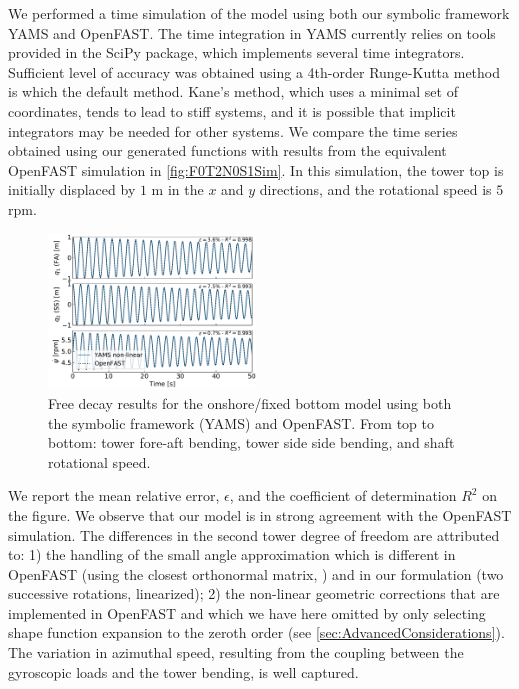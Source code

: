 \documentclass[wes, manuscript]{copernicus}
\begin{document}
We performed a time simulation of the model using both our symbolic framework YAMS and OpenFAST.
The time integration in YAMS currently relies on tools provided in the SciPy package, which implements several time integrators.
Sufficient level of accuracy was obtained using a 4th-order Runge-Kutta method is which the default method.
Kane's method, which uses a minimal set of coordinates, tends to lead to stiff systems, and it is possible that implicit integrators may be needed for other systems.
We compare the time series obtained using our generated functions with results from the equivalent OpenFAST simulation in \autoref{fig:F0T2N0S1Sim}.
In this simulation, the tower top is initially displaced by $1$ \unit{m} in the $x$ and $y$ directions, and the rotational speed is $5$ \unit{rpm}.
\noindent\begin{figure}[!htb]\centering%
  \includegraphics[width=0.49\textwidth]{figs/F0T2N0S1Sim}
  \caption{Free decay results for the onshore/fixed bottom model using both the symbolic framework (YAMS) and OpenFAST. From top to bottom: tower fore-aft bending, tower side side bending, and shaft rotational speed.}\label{fig:F0T2N0S1Sim}%
\end{figure}
We report the mean relative error, $\epsilon$, and the coefficient of determination $R^2$ on the figure.
We observe that our model is in strong agreement with the OpenFAST simulation.
The differences in the second tower degree of freedom are attributed to: 1) the handling of the small angle approximation which is different in OpenFAST (using the closest orthonormal matrix, \cite{Jonkman:2009}) and in our formulation (two successive rotations, linearized); 2) the non-linear geometric corrections that are implemented in OpenFAST and which we have here omitted by only selecting shape function expansion to the zeroth order (see \autoref{sec:AdvancedConsiderations}). 
The variation in azimuthal speed, resulting from the coupling between the gyroscopic loads and the tower bending, is well captured. 
\end{document}
